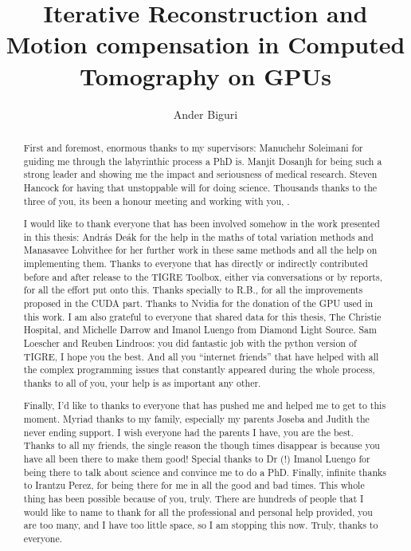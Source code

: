 \documentclass[11pt]{report}
\title{ Iterative Reconstruction and Motion compensation in Computed Tomography on GPUs}
\author{Ander Biguri}
\begin{document}
\maketitle





\tableofcontents
\listoffigures
\listoftables


\renewcommand{\abstractname}{Acknowledgements}
\begin{abstract}
First and foremost, enormous thanks to my supervisors:  Manuchehr Soleimani for guiding me through the labyrinthic process a PhD is. Manjit Dosanjh for being such a strong leader and showing me the impact and seriousness of medical research. Steven Hancock for having that unstoppable will for doing science. Thousands thanks to the three of you, its been a honour meeting and working with you, .

I would like to thank everyone that has been involved somehow in the work presented in this thesis: Andr\'as De\'ak for the help in the maths of total variation methods and Manasavee Lohvithee for her further work in these same methods and all the help on implementing them. Thanks to everyone that has directly or indirectly contributed before and after release to the TIGRE Toolbox, either via conversations or by reports, for all the effort put onto this. Thanks specially to R.B., for all the improvements proposed in the CUDA part. Thanks to Nvidia for the donation of the GPU used in this work. I am also grateful to everyone that shared data for this thesis, The Christie Hospital, and Michelle Darrow and Imanol Luengo from Diamond Light Source. Sam Loescher and Reuben Lindroos: you did fantastic job with the python version of TIGRE, I hope you the best. And all you ``internet friends'' that have helped with all the complex programming issues that constantly appeared during the whole process, thanks to all of you, your help is as important any other.

Finally, I'd like to thanks to everyone that has pushed me and helped me to get to this moment. Myriad thanks to my family, especially my parents Joseba and Judith the never ending support. I wish everyone had the parents I have, you are the best. Thanks to all my friends, the single reason the though times disappear is because you have all been there to make them good! Special thanks to Dr (!) Imanol Luengo for being there to talk about science and convince me to do a PhD. Finally, infinite thanks to Irantzu Perez, for being there for me in all the good and bad times. This whole thing has been possible because of you, truly. There are hundreds of people that I would like to name to thank for all the professional and personal help provided, you are too many, and I have too little space, so I am stopping this now. Truly, thanks to everyone.


\end{abstract}
\end{document}
